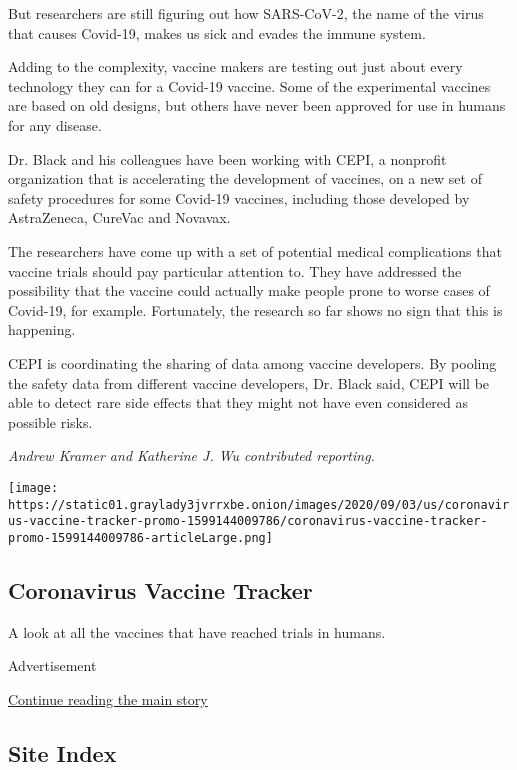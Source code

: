 But researchers are still figuring out how SARS-CoV-2, the name of the
virus that causes Covid-19, makes us sick and evades the immune system.

Adding to the complexity, vaccine makers are testing out just about
every technology they can for a Covid-19 vaccine. Some of the
experimental vaccines are based on old designs, but others have never
been approved for use in humans for any disease.

Dr. Black and his colleagues have been working with CEPI, a nonprofit
organization that is accelerating the development of vaccines, on a new
set of safety procedures for some Covid-19 vaccines, including those
developed by AstraZeneca, CureVac and Novavax.

The researchers have come up with a set of potential medical
complications that vaccine trials should pay particular attention to.
They have addressed the possibility that the vaccine could actually make
people prone to worse cases of Covid-19, for example. Fortunately, the
research so far shows no sign that this is happening.

CEPI is coordinating the sharing of data among vaccine developers. By
pooling the safety data from different vaccine developers, Dr. Black
said, CEPI will be able to detect rare side effects that they might not
have even considered as possible risks.

\emph{Andrew Kramer and Katherine J. Wu contributed reporting.}

\href{https://www.nytimes3xbfgragh.onion/interactive/2020/science/coronavirus-vaccine-tracker.html}{}

\texttt{[image: https://static01.graylady3jvrrxbe.onion/images/2020/09/03/us/coronavirus-vaccine-tracker-promo-1599144009786/coronavirus-vaccine-tracker-promo-1599144009786-articleLarge.png]}

\hypertarget{coronavirus-vaccine-tracker}{%
\subsection{Coronavirus Vaccine
Tracker}\label{coronavirus-vaccine-tracker}}

A look at all the vaccines that have reached trials in humans.

Advertisement

\protect\hyperlink{after-bottom}{Continue reading the main story}

\hypertarget{site-index}{%
\subsection{Site Index}\label{site-index}}

